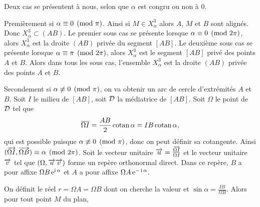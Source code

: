 Deux cas se présentent à nous, selon que $\alpha$ est congru ou non à 0.

Premièrement si $\alpha \equiv 0 \pmod {\pi}$. Ainsi si $M \in X_\alpha^3$ alors $A$, $M$ et $B$ sont alignés. Donc $X_\alpha^3 \subset (AB)$. Le premier sous cas se présente lorsque $\alpha \equiv 0 \pmod {2\pi}$, alors $X_\alpha^3$ est la droite $(AB)$ privée du segment $[AB]$. Le deuxième sous cas se présente lorsque $\alpha \equiv \pi \pmod {2\pi}$, alors  $X_\alpha^3$ est le segment $[AB]$ privé des points $A$ et $B$.  Alors dans tous les sous cas, l'ensemble $X_\alpha^3$ est la droite $(AB)$ privée des points $A$ et $B$.

Secondement si  $\alpha \not\equiv 0 \pmod {\pi}$, on va obtenir un arc de cercle d'extrémités $A$ et $B$. Soit $I$ le milieu de $[AB]$, soit $\mathcal{D}$ la médiatrice de $[AB]$. Soit $\Omega$ le point de $\mathcal{D}$ tel que
\begin{equation}
  \overline{\Omega I}=\frac{AB}{2}\operatorname{cotan} \alpha=IB \operatorname{cotan} \alpha,
\end{equation}
qui est possible puisque $\alpha \not\equiv 0 \pmod {\pi}$, donc on peut définir sa cotangente. Ainsi $(\overrightarrow{\Omega I},\overrightarrow{\Omega B}) \equiv \alpha \pmod {2\pi}$. Soit le vecteur unitaire $\overrightarrow{u}=\frac{\overrightarrow{\Omega I}}{\Omega I}$ et le vecteur unitaire $\overrightarrow{v}$ tel que $(\Omega, \overrightarrow{u} \overrightarrow{v})$ forme un repère orthonormal direct. Dans ce repère, $B$ a pour affixe $\Omega B \operatorname{e}^{\operatorname{i} \alpha}$ et $A$ a pour affixe $\Omega A \operatorname{e}^{-\operatorname{i} \alpha}$.

On définit le réel $r=\Omega A=\Omega B$ dont on cherche la valeur et $\sin \alpha = \frac{IB}{\Omega B}$. Alors pour tout point $M$ du plan,

